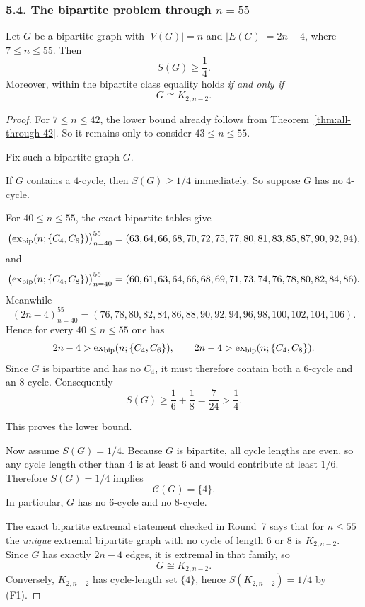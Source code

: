 \subsubsection*{5.4. The bipartite problem through $n=55$}

\begin{proposition}[Bipartite minimiser theorem through $n=55$]\label{prop:bip-55}
Let $G$ be a bipartite graph with $|V(G)|=n$ and $|E(G)|=2n-4$, where $7\le n\le 55$.
Then
\[
S(G)\ge \frac14.
\]
Moreover, within the bipartite class equality holds \emph{if and only if}
\[
G\cong K_{2,n-2}.
\]
\end{proposition}

\begin{proof}
For $7\le n\le 42$, the lower bound already follows from Theorem~\ref{thm:all-through-42}.
So it remains only to consider $43\le n\le 55$.

Fix such a bipartite graph $G$.

If $G$ contains a $4$-cycle, then $S(G)\ge 1/4$ immediately.
So suppose $G$ has no $4$-cycle.

For $40\le n\le 55$, the exact bipartite tables give
\[
\bigl(\operatorname{ex}_{\rm bip}(n;\{C_4,C_6\})\bigr)_{n=40}^{55}
=
(63,64,66,68,70,72,75,77,80,81,83,85,87,90,92,94),
\]
and
\[
\bigl(\operatorname{ex}_{\rm bip}(n;\{C_4,C_8\})\bigr)_{n=40}^{55}
=
(60,61,63,64,66,68,69,71,73,74,76,78,80,82,84,86).
\]
Meanwhile
\[
(2n-4)_{n=40}^{55}=(76,78,80,82,84,86,88,90,92,94,96,98,100,102,104,106).
\]
Hence for every $40\le n\le 55$ one has
\[
2n-4>\operatorname{ex}_{\rm bip}(n;\{C_4,C_6\}),
\qquad
2n-4>\operatorname{ex}_{\rm bip}(n;\{C_4,C_8\}).
\]
Since $G$ is bipartite and has no $C_4$, it must therefore contain both a $6$-cycle and an $8$-cycle.
Consequently
\[
S(G)\ge \frac16+\frac18=\frac7{24}>\frac14.
\]

This proves the lower bound.

Now assume $S(G)=1/4$.
Because $G$ is bipartite, all cycle lengths are even, so any cycle length other than $4$ is at least $6$ and would contribute at least $1/6$.
Therefore $S(G)=1/4$ implies
\[
\mathcal C(G)=\{4\}.
\]
In particular, $G$ has no $6$-cycle and no $8$-cycle.

The exact bipartite extremal statement checked in Round~7 says that for $n\le 55$ the \emph{unique} extremal bipartite graph with no cycle of length $6$ or $8$ is $K_{2,n-2}$.
Since $G$ has exactly $2n-4$ edges, it is extremal in that family, so
\[
G\cong K_{2,n-2}.
\]
Conversely, $K_{2,n-2}$ has cycle-length set $\{4\}$, hence $S(K_{2,n-2})=1/4$ by (F1).
\end{proof}


